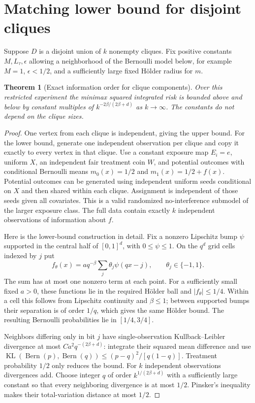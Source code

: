 \documentclass[11pt,a4paper]{article}
\newtheorem{theorem}{Theorem}[section]
\theoremstyle{definition}
\theoremstyle{remark}
\begin{document}
\section{Matching lower bound for disjoint cliques}
Suppose $D$ is a disjoint union of $k$ nonempty cliques. Fix positive constants $M,L_\tau,\epsilon$ allowing a neighborhood of the Bernoulli model below, for example $M=1$, $\epsilon<1/2$, and a sufficiently large fixed H\"older radius for $m$.
\begin{theorem}[Exact information order for clique components]
Over this restricted experiment the minimax squared integrated risk is bounded above and below by constant multiples of
$k^{-2\beta/(2\beta+d)}$ as $k\to\infty$. The constants do not depend on the clique sizes.
\end{theorem}
\begin{proof}
One vertex from each clique is independent, giving the upper bound. For the lower bound, generate one independent observation per clique and copy it exactly to every vertex in that clique. Use a constant exposure map $E_i=e$, uniform $X$, an independent fair treatment coin $W$, and potential outcomes with conditional Bernoulli means
$m_0(x)=1/2$ and $m_1(x)=1/2+f(x)$.
Potential outcomes can be generated using independent uniform seeds conditional on $X$ and then shared within each clique. Assignment is independent of those seeds given all covariates. This is a valid randomized no-interference submodel of the larger exposure class. The full data contain exactly $k$ independent observations of information about $f$.

Here is the lower-bound construction in detail. Fix a nonzero Lipschitz bump $\psi$ supported in the central half of $[0,1]^d$, with $0\le\psi\le1$. On the $q^d$ grid cells indexed by $j$ put
\[
 f_\theta(x)=a q^{-\beta}\sum_j\theta_j\psi(qx-j),
 \qquad \theta_j\in\{-1,1\}.
\]
The sum has at most one nonzero term at each point. For a sufficiently small fixed $a>0$, these functions lie in the required H\"older ball and $|f_\theta|\le1/4$. Within a cell this follows from Lipschitz continuity and $\beta\le1$; between supported bumps their separation is of order $1/q$, which gives the same H\"older bound. The resulting Bernoulli probabilities lie in $[1/4,3/4]$.

Neighbors differing only in bit $j$ have single-observation Kullback--Leibler divergence at most
$C a^2 q^{-(2\beta+d)}$: integrate their squared mean difference and use
$\operatorname{KL}(\operatorname{Bern}(p),\operatorname{Bern}(q))\le(p-q)^2/[q(1-q)]$.
Treatment probability $1/2$ only reduces the bound. For $k$ independent observations divergences add. Choose integer $q$ of order $k^{1/(2\beta+d)}$ with a sufficiently large constant so that every neighboring divergence is at most $1/2$. Pinsker's inequality makes their total-variation distance at most $1/2$.


\end{proof}
\end{document}
